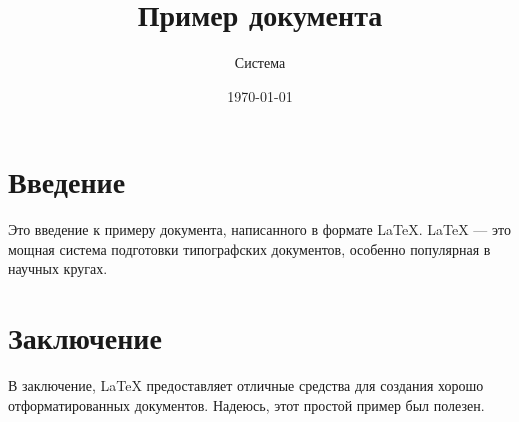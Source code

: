 \documentclass{article}
\title{Пример документа}
\author{Система}
\date{\today}
\begin{document}
\maketitle

\section{Введение}
Это введение к примеру документа, написанного в формате \LaTeX. \LaTeX{} --- это мощная система подготовки типографских документов, особенно популярная в научных кругах.

\section{Заключение}
В заключение, \LaTeX{} предоставляет отличные средства для создания хорошо отформатированных документов. Надеюсь, этот простой пример был полезен.
\end{document}
